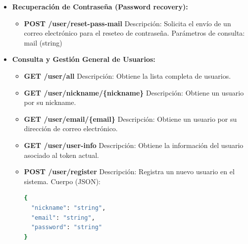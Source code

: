 \begin{itemize}
\begin{itemize}
        \item \textbf{GET /user/role/all}
        \newline Descripción: Obtiene todos los roles disponibles.

        \item \textbf{DELETE /user/role/delete}
        \newline Descripción: Borra un rol existente.
        \newline Cuerpo (JSON):
\begin{lstlisting}[language=bash]
{
  "name": "string"
}
\end{lstlisting}
    \end{itemize}
    
    \item \textbf{Recuperación de Contraseña (Password recovery):}
    \begin{itemize}
        \item \textbf{POST /user/reset-pass-mail}
        \newline Descripción: Solicita el envío de un correo electrónico para el reseteo de contraseña.
        \newline Parámetros de consulta: mail (string)
    \end{itemize}

    \item \textbf{Consulta y Gestión General de Usuarios:}
    \begin{itemize}
        \item \textbf{GET /user/all}
        \newline Descripción: Obtiene la lista completa de usuarios.

        \item \textbf{GET /user/nickname/\{nickname\}}
        \newline Descripción: Obtiene un usuario por su nickname.

        \item \textbf{GET /user/email/\{email\}}
        \newline Descripción: Obtiene un usuario por su dirección de correo electrónico.

        \item \textbf{GET /user/user-info}
        \newline Descripción: Obtiene la información del usuario asociado al token actual.

        \item \textbf{POST /user/register}
        \newline Descripción: Registra un nuevo usuario en el sistema.
        \newline Cuerpo (JSON):
\begin{lstlisting}[language=bash]
{
  "nickname": "string",
  "email": "string",
  "password": "string"
}
\end{lstlisting}


\end{itemize}
\end{itemize}
